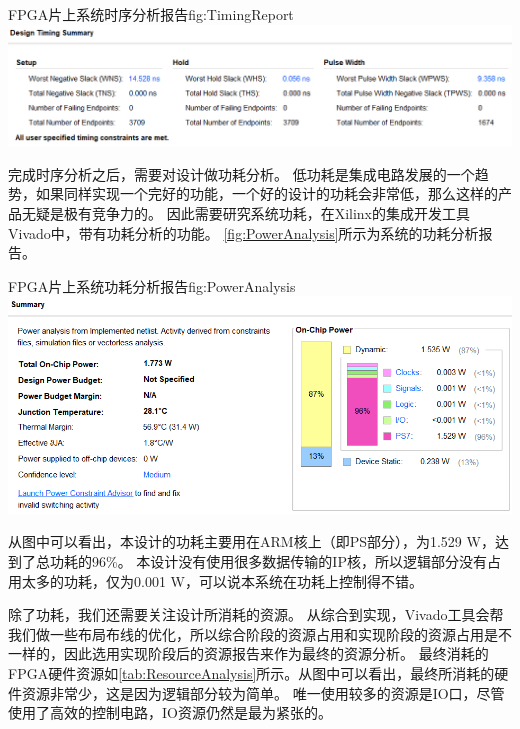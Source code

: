 \documentclass[supercite]{HustGraduPaper}
\begin{document}
\begin{generalfig}[htb]{FPGA片上系统时序分析报告}{fig:TimingReport}
	\includegraphics[width=\linewidth]{Figures/TimingReport.png}
\end{generalfig}

完成时序分析之后，需要对设计做功耗分析。
低功耗是集成电路发展的一个趋势，如果同样实现一个完好的功能，一个好的设计的功耗会非常低，那么这样的产品无疑是极有竞争力的。
因此需要研究系统功耗，在Xilinx的集成开发工具Vivado中，带有功耗分析的功能。
\autoref{fig:PowerAnalysis}所示为系统的功耗分析报告。

\begin{generalfig}[htb]{FPGA片上系统功耗分析报告}{fig:PowerAnalysis}
	\includegraphics[width=\linewidth]{Figures/PowerAnalysis.png}
\end{generalfig}

从图中可以看出，本设计的功耗主要用在ARM核上（即PS部分），为1.529 W，达到了总功耗的96\%。
本设计没有使用很多数据传输的IP核，所以逻辑部分没有占用太多的功耗，仅为0.001 W，可以说本系统在功耗上控制得不错。

除了功耗，我们还需要关注设计所消耗的资源。
从综合到实现，Vivado工具会帮我们做一些布局布线的优化，所以综合阶段的资源占用和实现阶段的资源占用是不一样的，因此选用实现阶段后的资源报告来作为最终的资源分析。
最终消耗的FPGA硬件资源如\autoref{tab:ResourceAnalysis}所示。从图中可以看出，最终所消耗的硬件资源非常少，这是因为逻辑部分较为简单。
唯一使用较多的资源是IO口，尽管使用了高效的控制电路，IO资源仍然是最为紧张的。
\end{document}
